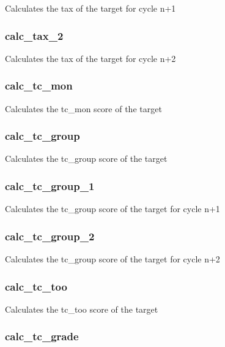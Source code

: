 \documentclass{article}
\begin{document}
Calculates the tax of the target for cycle n+1

\subsubsection*{calc\_tax\_2\label{Target_calc_tax_2}}


Calculates the tax of the target for cycle n+2

\subsubsection*{calc\_tc\_mon\label{Target_calc_tc_mon}}


Calculates the tc\_mon score of the target

\subsubsection*{calc\_tc\_group\label{Target_calc_tc_group}}


Calculates the tc\_group score of the target

\subsubsection*{calc\_tc\_group\_1\label{Target_calc_tc_group_1}}


Calculates the tc\_group score of the target for cycle n+1

\subsubsection*{calc\_tc\_group\_2\label{Target_calc_tc_group_2}}


Calculates the tc\_group score of the target for cycle n+2

\subsubsection*{calc\_tc\_too\label{Target_calc_tc_too}}


Calculates the tc\_too score of the target

\subsubsection*{calc\_tc\_grade\label{Target_calc_tc_grade}}
\end{document}
